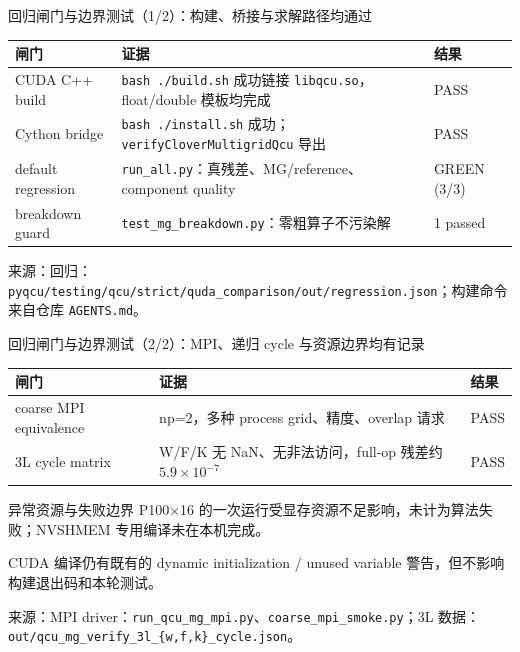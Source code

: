 \documentclass[UTF8,aspectratio=169,11pt]{ctexbeamer}
\newcommand{\source}[1]{%
  \vspace{0.06em}\par{\raggedright\scriptsize\color{muted}来源：#1\par}}
\newcommand{\code}[1]{\nolinkurl{#1}}
\newcommand{\passmark}{\textcolor{evidence}{PASS}}
\begin{document}
\begin{frame}[t]{回归闸门与边界测试（1/2）：构建、桥接与求解路径均通过}
  \begin{center}
    \small
    \begin{tabular}{@{}P{0.30\textwidth}P{0.43\textwidth}P{0.14\textwidth}@{}}
      \toprule
      闸门 & 证据 & 结果 \\
      \midrule
      CUDA C++ build & \code{bash ./build.sh} 成功链接 \code{libqcu.so}，float/double 模板均完成 & \passmark{} \\
      Cython bridge & \code{bash ./install.sh} 成功；\code{verifyCloverMultigridQcu} 导出 & \passmark{} \\
      default regression & \code{run_all.py}：真残差、MG/reference、component quality & GREEN (3/3) \\
      breakdown guard & \code{test_mg_breakdown.py}：零粗算子不污染解 & 1 passed \\
      \bottomrule
    \end{tabular}
  \end{center}
  \source{回归：\code{pyqcu/testing/qcu/strict/quda_comparison/out/regression.json}；构建命令来自仓库 \code{AGENTS.md}。}
\end{frame}

\begin{frame}[t]{回归闸门与边界测试（2/2）：MPI、递归 cycle 与资源边界均有记录}
  \begin{center}
    \small
    \begin{tabular}{@{}P{0.30\textwidth}P{0.43\textwidth}P{0.14\textwidth}@{}}
      \toprule
      闸门 & 证据 & 结果 \\
      \midrule
      coarse MPI equivalence & np=2，多种 process grid、精度、overlap 请求 & \passmark{} \\
      3L cycle matrix & W/F/K 无 NaN、无非法访问，full-op 残差约 $5.9\times10^{-7}$ & \passmark{} \\
      \bottomrule
    \end{tabular}
  \end{center}
  \vspace{0.25em}
  \begin{block}{异常资源与失败边界}
    \small
    P100×16 的一次运行受显存资源不足影响，未计为算法失败；NVSHMEM 专用编译未在本机完成。
    \par CUDA 编译仍有既有的 dynamic initialization / unused variable 警告，但不影响构建退出码和本轮测试。
  \end{block}
  \source{MPI driver：\code{run_qcu_mg_mpi.py}、\code{coarse_mpi_smoke.py}；3L 数据：\code{out/qcu_mg_verify_3l_{w,f,k}_cycle.json}。}
\end{frame}
\end{document}
